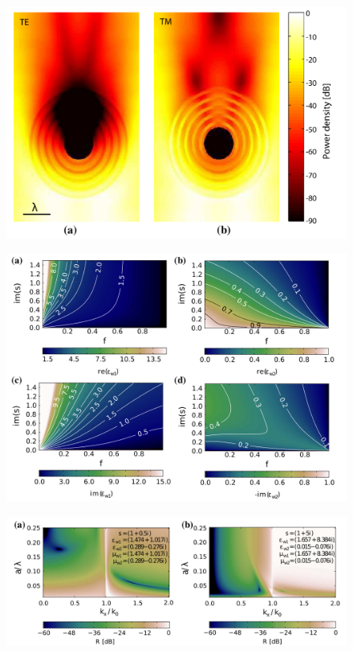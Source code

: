 \begin{figure}
\includegraphics[width=\textwidth]{images/pml/oqe_coreshell.png}
\end{figure}

\begin{figure}
\includegraphics[width=\textwidth]{images/pml/oqe_materials.png}
\end{figure}

\begin{figure}
\includegraphics[width=\textwidth]{images/pml/oqe_reflection_kat.png}
\end{figure}

